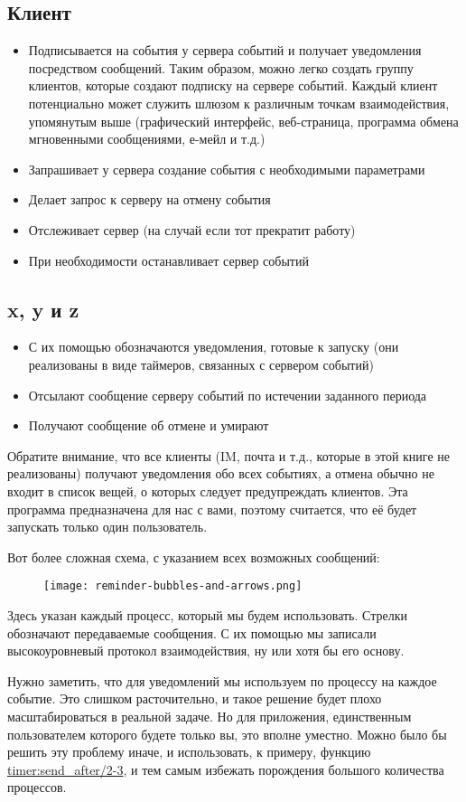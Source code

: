 \subsection{Клиент}
\begin{itemize}
\item Подписывается на события у сервера событий и получает уведомления посредством сообщений.
Таким образом, можно легко создать группу клиентов, которые создают подписку на сервере событий.
Каждый клиент потенциально может служить шлюзом к различным точкам взаимодействия, упомянутым выше (графический интерфейс, веб\--страница, программа обмена мгновенными сообщениями, е\--мейл и т.д.)
\item Запрашивает у сервера создание события с необходимыми параметрами
\item Делает запрос к серверу на отмену события
\item Отслеживает сервер (на случай если тот прекратит работу)
\item При необходимости останавливает сервер событий
\end{itemize}
\subsection{x, y и z}
\begin{itemize}
\item С их помощью обозначаются уведомления, готовые к запуску (они реализованы в виде таймеров, связанных с сервером событий)
\item Отсылают сообщение серверу событий по истечении заданного периода
\item Получают сообщение об отмене и умирают
\end{itemize}

Обратите внимание, что все клиенты (IM, почта и т.д., которые в этой книге не реализованы) получают уведомления обо всех событиях, а отмена обычно не входит в список вещей, о которых следует предупреждать клиентов.
Эта программа предназначена для нас с вами, поэтому считается, что её будет запускать только один пользователь.

Вот более сложная схема, с указанием всех возможных сообщений:
\begin{figure}[h!]
    \centering
    \texttt{[image: reminder-bubbles-and-arrows.png]}
\end{figure}

Здесь указан каждый процесс, который мы будем использовать.
Стрелки обозначают передаваемые сообщения.
С их помощью мы записали высокоуровневый протокол взаимодействия, ну или хотя бы его основу.

Нужно заметить, что для уведомлений мы используем по процессу на каждое событие.
Это слишком расточительно, и такое решение будет плохо масштабироваться в реальной задаче.
Но для приложения, единственным пользователем которого будете только вы, это вполне уместно.
Можно было бы решить эту проблему иначе, и использовать, к примеру, функцию \href{http://erldocs.com/R15B/stdlib/timer.html\#send_after/2}{timer:send\_after/2-3}, и тем самым избежать порождения большого количества процессов.
